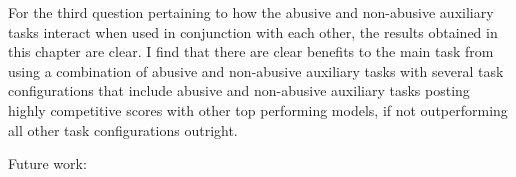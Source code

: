 For the third question pertaining to how the abusive and non-abusive auxiliary tasks interact when used in conjunction with each other, the results obtained in this chapter are clear.
I find that there are clear benefits to the main task from using a combination of abusive and non-abusive auxiliary tasks with several task configurations that include abusive and non-abusive auxiliary tasks posting highly competitive scores with other top performing models, if not outperforming all other task configurations outright.



Future work:
